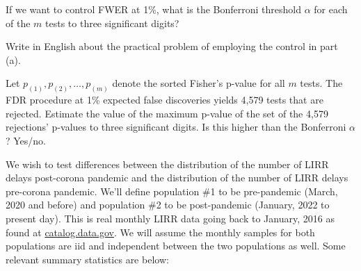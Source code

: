 \documentclass[12pt]{article}
\begin{document}
\begin{enumerate}[(a)]

 If we want to control FWER at 1\%, what is the Bonferroni threshold $\alpha$  for each of the $m$ tests to three significant digits?\\


 Write in English about the practical problem of employing the control in part (a).\\


 Let $p_{(1)}, p_{(2)}, \ldots, p_{(m)}$ denote the sorted Fisher's p-value for all $m$ tests. The FDR procedure at 1\% expected false discoveries yields 4,579 tests that are rejected. Estimate the value of the maximum p-value of the set of the 4,579 rejections' p-values to three significant digits. Is this higher than the Bonferroni $\alpha$? Yes/no.\\


\end{enumerate}

\problem We wish to test differences between the distribution of the number of LIRR delays  post-corona pandemic and the distribution of the number of LIRR delays pre-corona pandemic. We'll define population \#1 to be pre-pandemic (March, 2020 and before) and population \#2 to be post-pandemic (January, 2022 to present day). This is real monthly LIRR data going back to January, 2016 as found at \href{https://catalog.data.gov/dataset/?res_format=RDF&organization_type=State+Government&_tags_limit=0&organization=state-of-new-york&tags=performance}{catalog.data.gov}. We will assume the monthly samples for both populations are iid and independent between the two populations as well. Some relevant summary statistics are below:
\pagebreak
\end{document}
